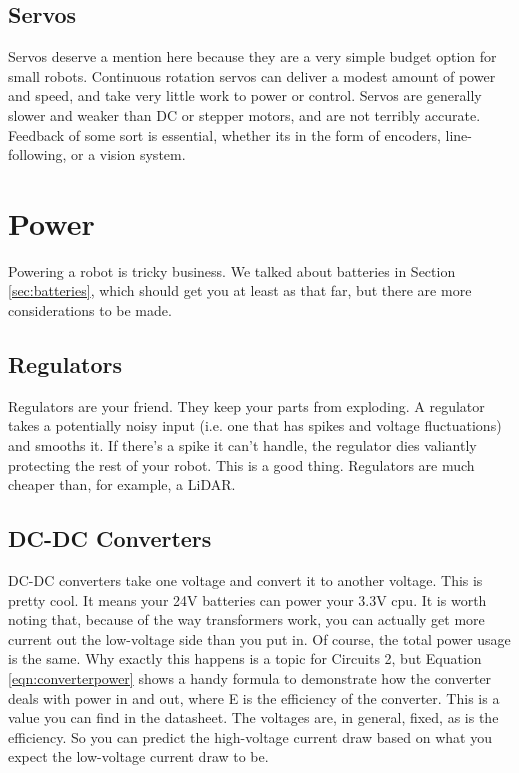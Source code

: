 \subsection{Servos}

Servos deserve a mention here because they are a very simple budget option for small robots. Continuous rotation servos can deliver a modest amount of power and speed, and take very little work to power or control. Servos are generally slower and weaker than DC or stepper motors, and are not terribly accurate. Feedback of some sort is essential, whether its in the form of encoders, line-following, or a vision system.

\section{Power}

Powering a robot is tricky business. We talked about batteries in Section \ref{sec:batteries}, which should get you at least as that far, but there are more considerations to be made.

\subsection{Regulators}
\label{sec:regulators}

Regulators are your friend. They keep your parts from exploding. A regulator takes a potentially noisy input (i.e. one that has spikes and voltage fluctuations) and smooths it. If there's a spike it can't handle, the regulator dies valiantly protecting the rest of your robot. This is a good thing. Regulators are much cheaper than, for example, a LiDAR.

\subsection{DC-DC Converters}

DC-DC converters take one voltage and convert it to another voltage. This is pretty cool. It means your 24V batteries can power your 3.3V cpu. It is worth noting that, because of the way transformers work, you can actually get more current out the low-voltage side than you put in. Of course, the total power usage is the same. Why exactly this happens is a topic for Circuits 2, but Equation \ref{eqn:converterpower} shows a handy formula to demonstrate how the converter deals with power in and out, where E is the efficiency of the converter. This is a value you can find in the datasheet. The voltages are, in general, fixed, as is the efficiency. So you can predict the high-voltage current draw based on what you expect the low-voltage current draw to be.

